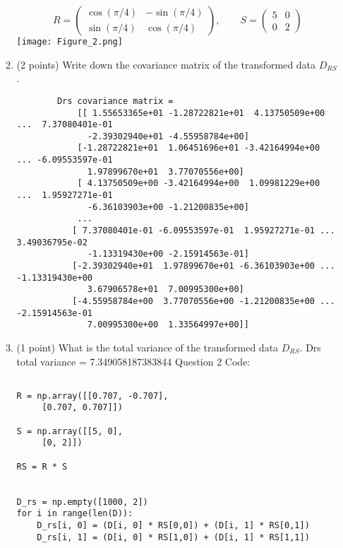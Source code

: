 \documentclass[11pt]{article}
\begin{document}
\begin{enumerate}
\begin{enumerate}
        $$
            R = \begin{pmatrix}
                \cos(\pi/4) & -\sin(\pi/4) \\
                \sin(\pi/4) & \cos(\pi/4)
            \end{pmatrix},
            \qquad
            S = \begin{pmatrix}
                5 & 0 \\
                0 & 2
            \end{pmatrix}
        $$
        \texttt{[image: Figure\_2.png]}
        \newpage
        \item (2 points) Write down the covariance matrix of the transformed
        data $D_{RS}$.
        \newline \begin{verbatim}
        Drs covariance matrix =
            [[ 1.55653365e+01 -1.28722821e+01  4.13750509e+00 ...  7.37080401e-01
              -2.39302940e+01 -4.55958784e+00]
            [-1.28722821e+01  1.06451696e+01 -3.42164994e+00 ... -6.09553597e-01
              1.97899670e+01  3.77070556e+00]
            [ 4.13750509e+00 -3.42164994e+00  1.09981229e+00 ...  1.95927271e-01
              -6.36103903e+00 -1.21200835e+00]
            ...
           [ 7.37080401e-01 -6.09553597e-01  1.95927271e-01 ...  3.49036795e-02
              -1.13319430e+00 -2.15914563e-01]
           [-2.39302940e+01  1.97899670e+01 -6.36103903e+00 ... -1.13319430e+00
              3.67906578e+01  7.00995300e+00]
           [-4.55958784e+00  3.77070556e+00 -1.21200835e+00 ... -2.15914563e-01
              7.00995300e+00  1.33564997e+00]]
        \end{verbatim}

        \item (1 point) What is the total variance of the transformed data
        $D_{RS}$.
        \newline Drs total variance =  7.349058187383844
    \newline Question 2 Code:    
    \begin{verbatim}
        
R = np.array([[0.707, -0.707],
     [0.707, 0.707]])

S = np.array([[5, 0],
     [0, 2]])

RS = R * S


D_rs = np.empty([1000, 2])
for i in range(len(D)):
    D_rs[i, 0] = (D[i, 0] * RS[0,0]) + (D[i, 1] * RS[0,1])
    D_rs[i, 1] = (D[i, 0] * RS[1,0]) + (D[i, 1] * RS[1,1])


\end{verbatim}
\end{enumerate}
\end{enumerate}
\end{document}
